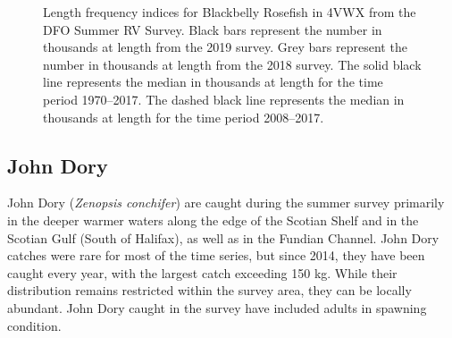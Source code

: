 \documentclass[11pt]{book}
\begin{document}
\begin{figure}[htb]

{\centering {} 

}

\caption{Length frequency indices for Blackbelly Rosefish in 4VWX from the DFO Summer RV Survey. Black bars represent the number in thousands at length from the 2019 survey. Grey bars represent the number in thousands at length from the 2018 survey. The solid black line represents the median in thousands at length for the time period 1970--2017. The dashed black line represents the median in thousands at length for the time period 2008--2017.}\label{fig:125-fig-bbrosefish-lengthfreq}
\end{figure}
\clearpage

\hypertarget{john-dory}{%
\subsection{John Dory}\label{john-dory}}

John Dory (\emph{Zenopsis conchifer}) are caught during the summer survey primarily in the deeper warmer waters along the edge of the Scotian Shelf and in the Scotian Gulf (South of Halifax), as well as in the Fundian Channel. John Dory catches were rare for most of the time series, but since 2014, they have been caught every year, with the largest catch exceeding 150 kg. While their distribution remains restricted within the survey area, they can be locally abundant. John Dory caught in the survey have included adults in spawning condition.
\end{document}
